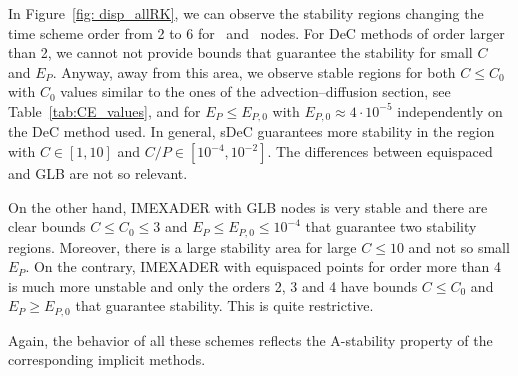 In Figure~\ref{fig: disp_allRK}, we can observe the stability regions changing the time scheme order from 2 to 6 for \GLB~and \eq~nodes. 
For DeC methods of order larger than 2, we cannot  not provide bounds that guarantee the stability for small $C$ and $E_P$.
Anyway, away from this area, we observe stable regions for both $C\leq C_0$ with $C_0$ values similar to the ones of the advection--diffusion section, see Table~\ref{tab:CE_values}, and for $E_P\leq E_{P,0}$ with $E_{P,0}\approx 4\cdot 10^{-5}$ independently on the DeC method used.
In general, sDeC guarantees more stability in the region with $C\in [1,10]$ and $C/P\in [10^{-4},10^{-2}]$. The differences between equispaced and GLB are not so relevant.

On the other hand, IMEXADER with GLB nodes is very stable and there are clear bounds $C\leq C_0\leq 3$ and $E_P\leq E_{P,0}\leq 10^{-4}$ that guarantee two stability regions. Moreover, there is a large stability area for large $C\leq 10$ and not so small $E_P$.
On the contrary, IMEXADER with equispaced points for order more than 4 is much more unstable and only the orders 2, 3 and 4 have bounds $C\leq C_0$ and $E_P \geq E_{P,0}$ that guarantee stability. This is quite restrictive.

Again, the behavior of all these schemes reflects the A-stability property of the corresponding implicit methods.



